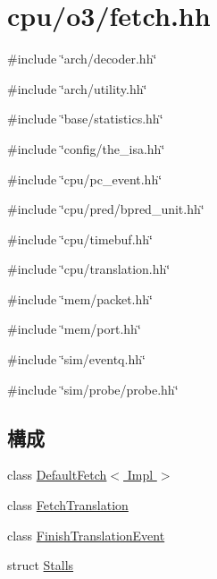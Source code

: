 \hypertarget{fetch_8hh}{
\section{cpu/o3/fetch.hh}
\label{fetch_8hh}
}
{\ttfamily \#include \char`\"{}arch/decoder.hh\char`\"{}}\par
{\ttfamily \#include \char`\"{}arch/utility.hh\char`\"{}}\par
{\ttfamily \#include \char`\"{}base/statistics.hh\char`\"{}}\par
{\ttfamily \#include \char`\"{}config/the\_\-isa.hh\char`\"{}}\par
{\ttfamily \#include \char`\"{}cpu/pc\_\-event.hh\char`\"{}}\par
{\ttfamily \#include \char`\"{}cpu/pred/bpred\_\-unit.hh\char`\"{}}\par
{\ttfamily \#include \char`\"{}cpu/timebuf.hh\char`\"{}}\par
{\ttfamily \#include \char`\"{}cpu/translation.hh\char`\"{}}\par
{\ttfamily \#include \char`\"{}mem/packet.hh\char`\"{}}\par
{\ttfamily \#include \char`\"{}mem/port.hh\char`\"{}}\par
{\ttfamily \#include \char`\"{}sim/eventq.hh\char`\"{}}\par
{\ttfamily \#include \char`\"{}sim/probe/probe.hh\char`\"{}}\par
\subsection*{構成}
\begin{DoxyCompactItemize}
\item 
class \hyperlink{classDefaultFetch}{DefaultFetch$<$ Impl $>$}
\item 
class \hyperlink{classDefaultFetch_1_1FetchTranslation}{FetchTranslation}
\item 
class \hyperlink{classDefaultFetch_1_1FinishTranslationEvent}{FinishTranslationEvent}
\item 
struct \hyperlink{structDefaultFetch_1_1Stalls}{Stalls}
\end{DoxyCompactItemize}
